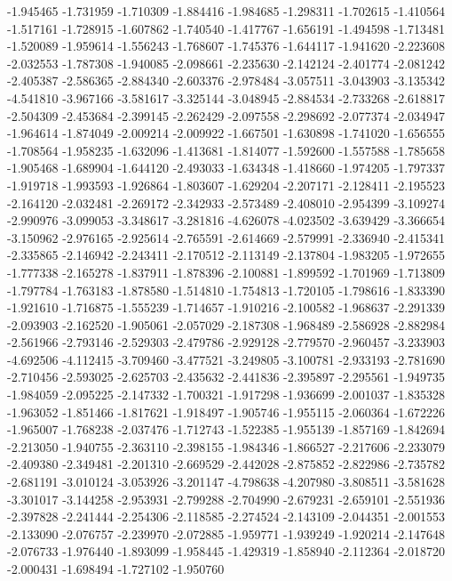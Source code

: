 -1.945465
-1.731959
-1.710309
-1.884416
-1.984685
-1.298311
-1.702615
-1.410564
-1.517161
-1.728915
-1.607862
-1.740540
-1.417767
-1.656191
-1.494598
-1.713481
-1.520089
-1.959614
-1.556243
-1.768607
-1.745376
-1.644117
-1.941620
-2.223608
-2.032553
-1.787308
-1.940085
-2.098661
-2.235630
-2.142124
-2.401774
-2.081242
-2.405387
-2.586365
-2.884340
-2.603376
-2.978484
-3.057511
-3.043903
-3.135342
-4.541810
-3.967166
-3.581617
-3.325144
-3.048945
-2.884534
-2.733268
-2.618817
-2.504309
-2.453684
-2.399145
-2.262429
-2.097558
-2.298692
-2.077374
-2.034947
-1.964614
-1.874049
-2.009214
-2.009922
-1.667501
-1.630898
-1.741020
-1.656555
-1.708564
-1.958235
-1.632096
-1.413681
-1.814077
-1.592600
-1.557588
-1.785658
-1.905468
-1.689904
-1.644120
-2.493033
-1.634348
-1.418660
-1.974205
-1.797337
-1.919718
-1.993593
-1.926864
-1.803607
-1.629204
-2.207171
-2.128411
-2.195523
-2.164120
-2.032481
-2.269172
-2.342933
-2.573489
-2.408010
-2.954399
-3.109274
-2.990976
-3.099053
-3.348617
-3.281816
-4.626078
-4.023502
-3.639429
-3.366654
-3.150962
-2.976165
-2.925614
-2.765591
-2.614669
-2.579991
-2.336940
-2.415341
-2.335865
-2.146942
-2.243411
-2.170512
-2.113149
-2.137804
-1.983205
-1.972655
-1.777338
-2.165278
-1.837911
-1.878396
-2.100881
-1.899592
-1.701969
-1.713809
-1.797784
-1.763183
-1.878580
-1.514810
-1.754813
-1.720105
-1.798616
-1.833390
-1.921610
-1.716875
-1.555239
-1.714657
-1.910216
-2.100582
-1.968637
-2.291339
-2.093903
-2.162520
-1.905061
-2.057029
-2.187308
-1.968489
-2.586928
-2.882984
-2.561966
-2.793146
-2.529303
-2.479786
-2.929128
-2.779570
-2.960457
-3.233903
-4.692506
-4.112415
-3.709460
-3.477521
-3.249805
-3.100781
-2.933193
-2.781690
-2.710456
-2.593025
-2.625703
-2.435632
-2.441836
-2.395897
-2.295561
-1.949735
-1.984059
-2.095225
-2.147332
-1.700321
-1.917298
-1.936699
-2.001037
-1.835328
-1.963052
-1.851466
-1.817621
-1.918497
-1.905746
-1.955115
-2.060364
-1.672226
-1.965007
-1.768238
-2.037476
-1.712743
-1.522385
-1.955139
-1.857169
-1.842694
-2.213050
-1.940755
-2.363110
-2.398155
-1.984346
-1.866527
-2.217606
-2.233079
-2.409380
-2.349481
-2.201310
-2.669529
-2.442028
-2.875852
-2.822986
-2.735782
-2.681191
-3.010124
-3.053926
-3.201147
-4.798638
-4.207980
-3.808511
-3.581628
-3.301017
-3.144258
-2.953931
-2.799288
-2.704990
-2.679231
-2.659101
-2.551936
-2.397828
-2.241444
-2.254306
-2.118585
-2.274524
-2.143109
-2.044351
-2.001553
-2.133090
-2.076757
-2.239970
-2.072885
-1.959771
-1.939249
-1.920214
-2.147648
-2.076733
-1.976440
-1.893099
-1.958445
-1.429319
-1.858940
-2.112364
-2.018720
-2.000431
-1.698494
-1.727102
-1.950760

